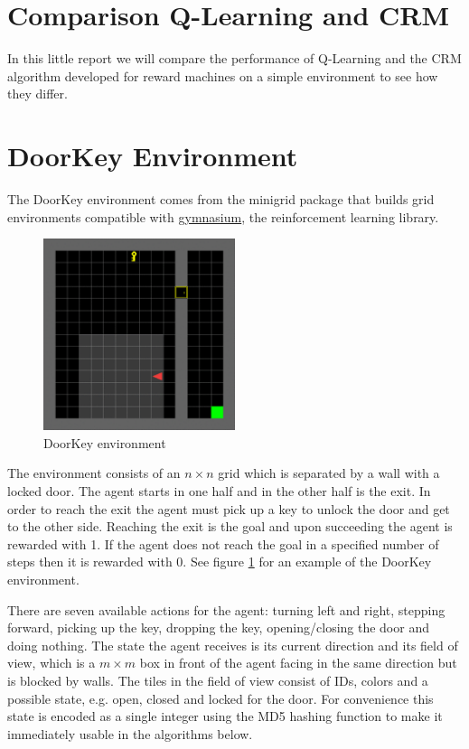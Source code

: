 \documentclass[12pt, a4paper]{article}
\begin{document}
\section*{Comparison Q-Learning and CRM}

In this little report we will compare the performance of Q-Learning and the CRM algorithm developed for reward machines on a simple environment to see how they differ.

\section*{DoorKey Environment}

The DoorKey environment comes from the minigrid package that builds grid environments compatible with \href{https://gymnasium.farama.org/}{gymnasium}, the reinforcement learning library.

\begin{figure}[h]
	\begin{center}
		\includegraphics[width=0.5\textwidth]{figures/doorkey.png}
	\end{center}
	\caption{DoorKey environment}
	\label{fig:doorkey}
\end{figure}

The environment consists of an $n \times n$ grid which is separated by a wall with a locked door. The agent starts in one half and in the other half is the exit. In order to reach the exit the agent must pick up a key to unlock the door and get to the other side. Reaching the exit is the goal and upon succeeding the agent is rewarded with 1. If the agent does not reach the goal in a specified number of steps then it is rewarded with 0. See figure \ref{fig:doorkey} for an example of the DoorKey environment.

There are seven available actions for the agent: turning left and right, stepping forward, picking up the key, dropping the key, opening/closing the door and doing nothing. The state the agent receives is its current direction and its field of view, which is a $m \times m$ box in front of the agent facing in the same direction but is blocked by walls. The tiles in the field of view consist of IDs, colors and a possible state, e.g. open, closed and locked for the door. For convenience this state is encoded as a single integer using the MD5 hashing function to make it immediately usable in the algorithms below.
\end{document}

